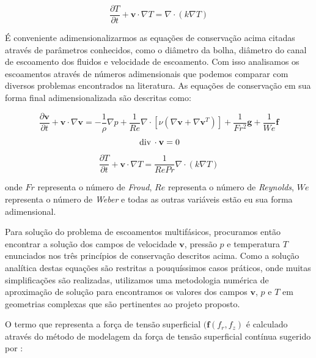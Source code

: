 \documentclass[a4paper,portuges,12pt]{article}
\newcommand{\diverg}{{\,\rm div}\,}
\newcommand{\vvet}{\mathbf{v}}
\begin{document}
\begin{equation}
	\frac{\partial T}{\partial t} + \vvet \cdot \nabla T
	=  
	\nabla \cdot (k \nabla T)
\label{eq:quimica2}
\end{equation}\vspace{0.5cm}

É conveniente adimensionalizarmos as equações de conservação acima
citadas através de parâmetros conhecidos, como o diâmetro da bolha,
diâmetro do canal de escoamento dos fluidos e velocidade de escoamento.
Com isso analisamos os escoamentos através de números adimensionais que
podemos comparar com diversos problemas encontrados na literatura. As
equações de conservação em sua forma final adimensionalizada são
descritas como:

\begin{equation}
	\frac{\partial \vvet}{\partial t} + \vvet \cdot \nabla \vvet
	=
	-\frac{1}{\rho} \nabla p + \frac{1}{Re} \nabla \cdot
	[\nu ( \nabla \vvet + \nabla \vvet^T)]+
	\frac{1}{Fr^2} \mathbf{g} + 
	\frac{1}{We} \mathbf{f}
	\label{eq:final1}
\end{equation}
\begin{equation}
	\diverg \cdot \vvet = 0
	\label{eq:final2} 
\end{equation}	
\begin{equation}
	\frac{\partial T}{\partial t} + \vvet \cdot \nabla T
	=
	\frac{1}{RePr} \nabla \cdot (k \nabla T)
	\label{eq:final3}
\end{equation}\vspace{0.5cm}

\noindent onde $Fr$ representa o número de \textit{Froud}, $Re$
representa o número de \textit{Reynolds}, $We$ representa o número de
\textit{Weber} e todas as outras variáveis estão eu sua forma
adimensional.

Para solução do problema de escoamentos multifásicos, procuramos então
encontrar a solução dos campos de velocidade $\vvet$, pressão $p$ e
temperatura $T$ enunciados nos três princípios de conservação descritos
acima. Como a solução analítica destas equações são restritas a
pouquíssimos casos práticos, onde muitas simplificações são realizadas,
utilizamos uma metodologia numérica de aproximação de solução para
encontramos os valores dos campos $\vvet$, $p$ e $T$ em geometrias
complexas que são pertinentes ao projeto proposto. 

O termo que representa a força de tensão superficial
$(\mathbf{f}(f_r,f_z)$ é calculado através do método de modelagem da
força de tensão superficial contínua sugerido por \cite{brackbill1992}:
\end{document}
